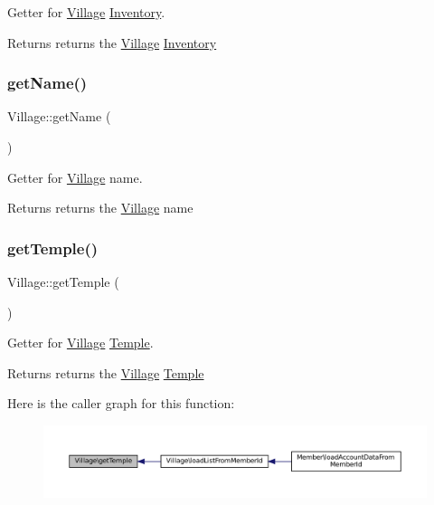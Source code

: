 Getter for \mbox{\hyperlink{classVillage}{Village}} \mbox{\hyperlink{classInventory}{Inventory}}. 

\begin{DoxyReturn}{Returns}
returns the \mbox{\hyperlink{classVillage}{Village}} \mbox{\hyperlink{classInventory}{Inventory}} 
\end{DoxyReturn}
\mbox{\label{classVillage_a42259e980f432193138a5cad1d48866f}} 
\subsubsection{\texorpdfstring{get\+Name()}{getName()}}
{\footnotesize\ttfamily Village\+::get\+Name (\begin{DoxyParamCaption}{ }\end{DoxyParamCaption})}



Getter for \mbox{\hyperlink{classVillage}{Village}} name. 

\begin{DoxyReturn}{Returns}
returns the \mbox{\hyperlink{classVillage}{Village}} name 
\end{DoxyReturn}
\mbox{\label{classVillage_a75b6534f378f19bb04147fd5c85a1de9}} 
\subsubsection{\texorpdfstring{get\+Temple()}{getTemple()}}
{\footnotesize\ttfamily Village\+::get\+Temple (\begin{DoxyParamCaption}{ }\end{DoxyParamCaption})}



Getter for \mbox{\hyperlink{classVillage}{Village}} \mbox{\hyperlink{classTemple}{Temple}}. 

\begin{DoxyReturn}{Returns}
returns the \mbox{\hyperlink{classVillage}{Village}} \mbox{\hyperlink{classTemple}{Temple}} 
\end{DoxyReturn}
Here is the caller graph for this function\+:
\nopagebreak
\begin{figure}[H]
\begin{center}
\leavevmode
\includegraphics[width=350pt]{classVillage_a75b6534f378f19bb04147fd5c85a1de9_icgraph}
\end{center}
\end{figure}
\mbox{\label{classVillage_a32709e6efc8c58dcedea9727cfa44973}} 
